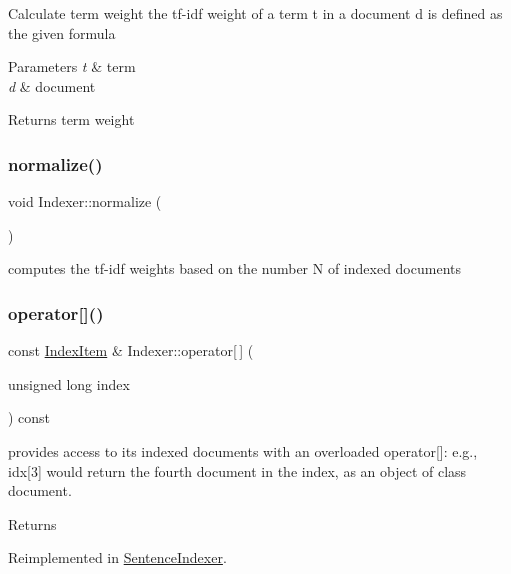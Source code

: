 Calculate term weight the tf-\/idf weight of a term t in a document d is defined as the given formula 
\begin{DoxyParams}{Parameters}
{\em t} & term \\
\hline
{\em d} & document \\
\hline
\end{DoxyParams}
\begin{DoxyReturn}{Returns}
term weight 
\end{DoxyReturn}
\mbox{\label{classIndexer_ae090be1899c4ce1e4baeb0acfe12cdee}} 
\subsubsection{\texorpdfstring{normalize()}{normalize()}}
{\footnotesize\ttfamily void Indexer\+::normalize (\begin{DoxyParamCaption}{ }\end{DoxyParamCaption})}

computes the tf-\/idf weights based on the number N of indexed documents \mbox{\label{classIndexer_ac9a2012415a2b06251852047e30bf618}} 
\subsubsection{\texorpdfstring{operator[]()}{operator[]()}}
{\footnotesize\ttfamily const \hyperlink{classIndexItem}{Index\+Item} \& Indexer\+::operator\mbox{[}$\,$\mbox{]} (\begin{DoxyParamCaption}\item[{unsigned long}]{index }\end{DoxyParamCaption}) const\hspace{0.3cm}{\ttfamily [virtual]}}

provides access to its indexed documents with an overloaded operator\mbox{[}\mbox{]}\+: e.\+g., idx\mbox{[}3\mbox{]} would return the fourth document in the index, as an object of class document. \begin{DoxyReturn}{Returns}

\end{DoxyReturn}


Reimplemented in \hyperlink{classSentenceIndexer_a0c0b7ee70c1d183e6bd6ca4ee412831c}{Sentence\+Indexer}.


